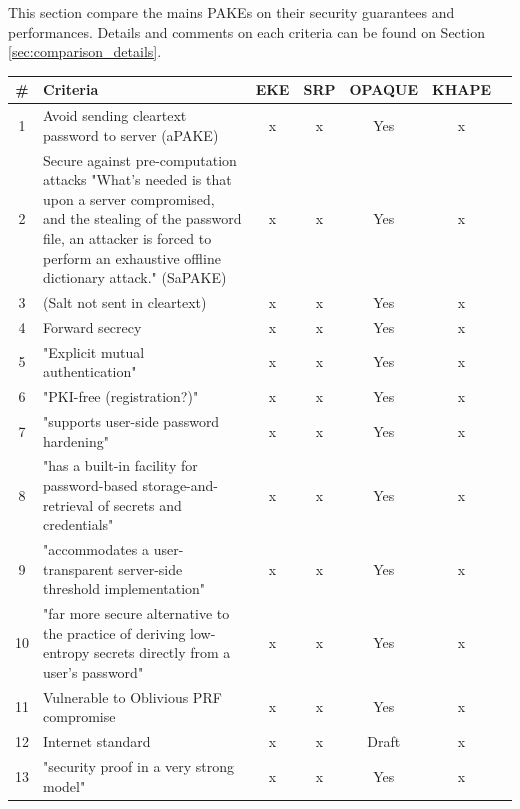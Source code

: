 \documentclass[../report.tex]{subfiles}
\begin{document}
This section compare the mains PAKEs on their security guarantees and performances. Details and comments on each criteria can be found on Section \ref{sec:comparison_details}.

\begin{center}
   \begin{tabular}{ | c | p{8cm} || c | c | c | c | c | }
     \hline
     \textbf{\#} & \textbf{Criteria} & \textbf{EKE} & \textbf{SRP} & \textbf{OPAQUE} & \textbf{KHAPE} \\ \hline
     
     
     
     1 & Avoid sending cleartext password to server (aPAKE) & x & x & Yes & x \\ \hline
     
     2 & Secure against pre-computation attacks {"What's needed is that upon a server compromised, and the stealing of the password file, an attacker is forced to perform an exhaustive offline dictionary attack."} (SaPAKE) & x & x & Yes & x \\ \hline
     
     3 & (Salt not sent in cleartext) & x & x & Yes & x \\ \hline
     4 & Forward secrecy & x & x & Yes & x \\ \hline
     5 & "Explicit mutual authentication" & x & x & Yes & x \\ \hline
     6 & "PKI-free (registration?)" & x & x & Yes & x \\ \hline
     7 & "supports user-side password hardening" & x & x & Yes & x \\ \hline
     8 & "has a built-in facility for password-based storage-and-retrieval of secrets and credentials" & x & x & Yes & x \\ \hline
     9 & "accommodates a user-transparent server-side threshold implementation" & x & x & Yes & x \\ \hline
     10 &"far more secure alternative to the practice of deriving low-entropy secrets directly from a user's password" & x & x & Yes & x \\ \hline
     
     11 & Vulnerable to Oblivious PRF compromise & x & x & Yes & x \\ \hline
     12 & Internet standard & x & x & Draft & x \\ \hline
     
     13 & "security proof in a very strong model" & x & x & Yes & x \\ \hline
     

\end{tabular}
\end{center}
\end{document}
